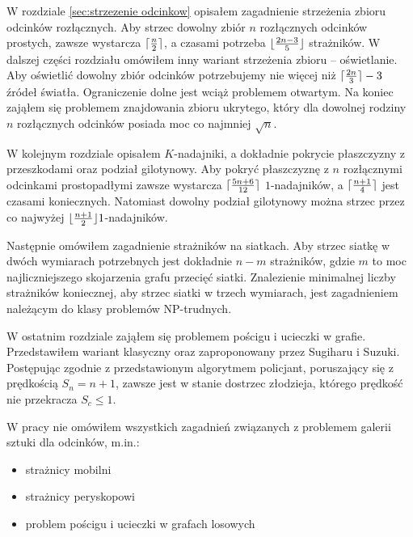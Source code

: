 \documentclass{xmgr}
\DeclarePairedDelimiter\ceil{\lceil}{\rceil}
\DeclarePairedDelimiter\floor{\lfloor}{\rfloor}
\theoremstyle{definition}
\begin{document}
W rozdziale \ref{sec:strzezenie odcinkow} opisałem zagadnienie strzeżenia zbioru odcinków rozłącznych.
Aby strzec dowolny zbiór $n$ rozłącznych odcinków prostych, zawsze wystarcza $\ceil{\frac{n}{2}}$, a czasami potrzeba $\floor{\frac{2n-3}{5}}$ strażników. W dalszej części rozdziału omówiłem inny wariant strzeżenia zbioru -- oświetlanie. Aby oświetlić dowolny zbiór odcinków potrzebujemy nie więcej niż $\ceil{\frac{2n}{3}}-3$ źródeł światła. Ograniczenie dolne jest wciąż problemem otwartym. Na koniec zająłem  się problemem znajdowania zbioru ukrytego, który dla dowolnej rodziny $n$ rozłącznych odcinków posiada moc co najmniej $\sqrt{n}$.

W kolejnym rozdziale opisałem $K$-nadajniki, a dokładnie pokrycie płaszczyzny z przeszkodami oraz podział gilotynowy. Aby pokryć płaszczyznę z $n$ rozłącznymi odcinkami prostopadłymi zawsze wystarcza $\ceil{\frac{5n+6}{12}}$ $1$-nadajników, a $\ceil{\frac{n+1}{4}}$ jest czasami koniecznych. Natomiast dowolny podział gilotynowy można strzec przez co najwyżej $\floor{\frac{n+1}{2}} 1$-nadajników.

Następnie omówiłem zagadnienie strażników na siatkach. Aby strzec siatkę w dwóch wymiarach potrzebnych jest dokładnie $n-m$ strażników, gdzie $m$ to moc najliczniejszego skojarzenia grafu przecięć siatki. Znalezienie minimalnej liczby strażników koniecznej, aby strzec siatki w trzech wymiarach, jest zagadnieniem należącym do klasy problemów NP-trudnych.

W ostatnim rozdziale zająłem się problemem pościgu i ucieczki w grafie. Przedstawiłem wariant klasyczny oraz zaproponowany przez Sugiharu i Suzuki. Postępując zgodnie z przedstawionym algorytmem policjant, poruszający się z prędkością $S_n = n + 1$, zawsze jest w stanie dostrzec złodzieja, którego prędkość nie przekracza $S_c \leq 1$. 

W pracy nie omówiłem wszystkich zagadnień związanych z problemem galerii sztuki dla odcinków, m.in.:
\begin{itemize}
 \item strażnicy mobilni \cite{mobileguards}
 \item strażnicy peryskopowi \cite{periscope}
 \item problem pościgu i ucieczki w grafach losowych \cite{randompursuit}
\end{itemize}

\appendix
\end{document}
